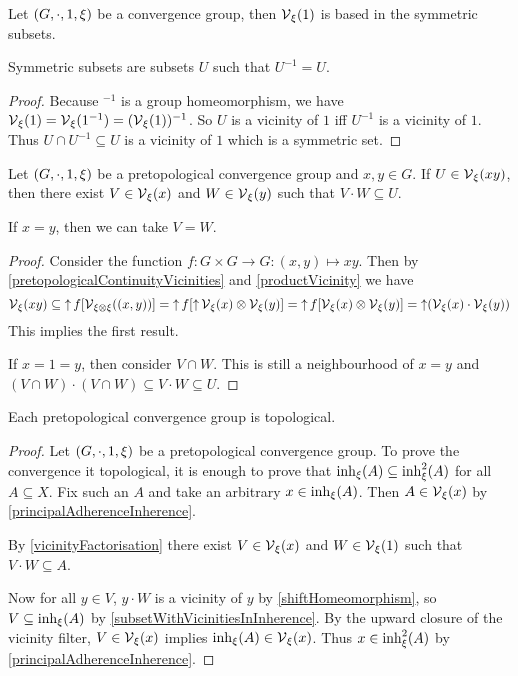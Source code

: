 \begin{lemma} \label{symmetricBase}
Let $\left( G,\cdot, 1, \xi \right)$ be a convergence group, then $\operatorname{\mathcal{V}}_\xi(1)$ is based in the symmetric subsets.
\end{lemma}
Symmetric subsets are subsets $U$ such that $U^{-1} = U$.
\begin{proof}
Because $^{-1}$ is a group homeomorphism, we have $\operatorname{\mathcal{V}}_\xi(1) = \operatorname{\mathcal{V}}_\xi(1^{-1}) = (\operatorname{\mathcal{V}}_\xi(1))^{-1}$. So $U$ is a vicinity of $1$ iff $U^{-1}$ is a vicinity of $1$. Thus $U\cap U^{-1}\subseteq U$ is a vicinity of $1$ which is a symmetric set.
\end{proof}

\begin{lemma} \label{vicinityFactorisation}
Let $\left( G,\cdot, 1, \xi \right)$ be a pretopological convergence group and $x,y\in G$. If $U\in \operatorname{\mathcal{V}}_\xi(xy)$, then there exist $V\in \operatorname{\mathcal{V}}_\xi(x)$ and $W\in \operatorname{\mathcal{V}}_\xi(y)$ such that $V\cdot W\subseteq U$.

If $x=y$, then we can take $V = W$.
\end{lemma}
\begin{proof}
Consider the function $f: G\times G \to G: (x,y)\mapsto xy$. Then by \ref{pretopologicalContinuityVicinities} and \ref{productVicinity} we have
\[ \operatorname{\mathcal{V}}_\xi(xy) \subseteq \operatorname{\uparrow} f[\operatorname{\mathcal{V}}_{\xi\otimes\xi}((x,y))] = \operatorname{\uparrow} f[\operatorname{\uparrow} \operatorname{\mathcal{V}}_\xi(x)\otimes \operatorname{\mathcal{V}}_\xi(y)] = \operatorname{\uparrow} f[\operatorname{\mathcal{V}}_\xi(x)\otimes \operatorname{\mathcal{V}}_\xi(y)] = \operatorname{\uparrow} (\operatorname{\mathcal{V}}_\xi(x)\cdot \operatorname{\mathcal{V}}_\xi(y)) \]
This implies the first result.

If $x=1=y$, then consider $V\cap W$. This is still a neighbourhood of $x=y$ and $(V\cap W)\cdot(V\cap W) \subseteq V\cdot W \subseteq U$.
\end{proof}

\begin{proposition} \label{pretopologicalGroupConvergence}
Each pretopological convergence group is topological.
\end{proposition}
\begin{proof}
Let $\left( G,\cdot, 1, \xi \right)$ be a pretopological convergence group. To prove the convergence it topological, it is enough to prove that $\operatorname{inh}_\xi(A) \subseteq \operatorname{inh}^2_\xi(A)$ for all $A\subseteq X$. Fix such an $A$ and take an arbitrary $x\in \operatorname{inh}_\xi(A)$. Then $A\in \operatorname{\mathcal{V}}_\xi(x)$ by \ref{principalAdherenceInherence}.

By \ref{vicinityFactorisation} there exist $V\in \operatorname{\mathcal{V}}_\xi(x)$ and $W\in\operatorname{\mathcal{V}}_\xi(1)$ such that $V\cdot W \subseteq A$.

Now for all $y\in V$, $y\cdot W$ is a vicinity of $y$ by \ref{shiftHomeomorphism}, so $V \subseteq \operatorname{inh}_\xi(A)$ by \ref{subsetWithVicinitiesInInherence}. By the upward closure of the vicinity filter, $V\in \operatorname{\mathcal{V}}_\xi(x)$ implies $\operatorname{inh}_\xi(A) \in \operatorname{\mathcal{V}}_\xi(x)$. Thus $x\in \operatorname{inh}_\xi^2(A)$ by \ref{principalAdherenceInherence}.
\end{proof}

